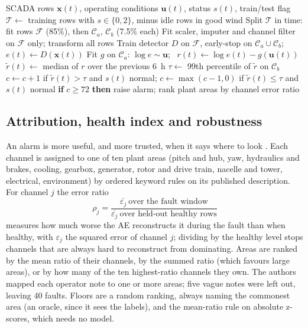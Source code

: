 \documentclass[conference]{IEEEtran}
\begin{document}
\begin{algorithm}[t]
\caption{Leakage-safe scoring of one turbine dataset}
\label{alg:pipeline}
\small
\begin{algorithmic}[1]
\Require SCADA rows $\mathbf{x}(t)$, operating conditions $\mathbf{u}(t)$, status $s(t)$, train/test flag
\State $\mathcal{T}\gets$ training rows with $s\in\{0,2\}$, minus idle rows in good wind
\State Split $\mathcal{T}$ in time: fit rows $\mathcal{F}$ (85\%), then $\mathcal{C}_a$, $\mathcal{C}_b$ (7.5\% each)
\State Fit scaler, imputer and channel filter on $\mathcal{F}$ only; transform all rows
\State Train detector $D$ on $\mathcal{F}$, early-stop on $\mathcal{C}_a\cup\mathcal{C}_b$; $e(t)\gets D(\mathbf{x}(t))$
\State Fit $g$ on $\mathcal{C}_a$: $\log e \sim \mathbf{u}$; \ $r(t)\gets\log e(t)-g(\mathbf{u}(t))$
\State $\tilde r(t)\gets$ median of $r$ over the previous 6~h 
\State $\tau\gets$ 99th percentile of $\tilde r$ on $\mathcal{C}_b$
\State $c\gets c+1$ if $\tilde r(t)>\tau$ and $s(t)$ normal; $c\gets\max(c-1,0)$ if $\tilde r(t)\le\tau$ and $s(t)$ normal
\State \textbf{if} $c\ge 72$ \textbf{then} raise alarm; rank plant areas by channel error ratio
\EndFor
\end{algorithmic}
\end{algorithm}

\subsection{Attribution, health index and robustness}
An alarm is more useful, and more trusted, when it says where to look \cite{r3}. Each channel is assigned to one of ten plant areas (pitch and hub, yaw, hydraulics and brakes, cooling, gearbox, generator, rotor and drive train, nacelle and tower, electrical, environment) by ordered keyword rules on its published description. For channel $j$ the error ratio
\begin{equation}
\rho_j=\frac{\overline{\varepsilon_j}\ \text{over the fault window}}{\overline{\varepsilon_j}\ \text{over held-out healthy rows}}
\end{equation}
measures how much worse the AE reconstructs it during the fault than when healthy, with $\varepsilon_j$ the squared error of channel $j$; dividing by the healthy level stops channels that are always hard to reconstruct from dominating. Areas are ranked by the mean ratio of their channels, by the summed ratio (which favours large areas), or by how many of the ten highest-ratio channels they own. The authors mapped each operator note to one or more areas; five vague notes were left out, leaving 40 faults. Floors are a random ranking, always naming the commonest area (an oracle, since it sees the labels), and the mean-ratio rule on absolute z-scores, which needs no model.
\end{document}
